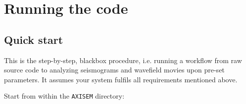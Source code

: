 \documentclass{article}
\begin{document}
\newpage

\section{Running the code}

\subsection{Quick start}

This is the step-by-step, blackbox procedure, i.e. running a workflow from raw source code
to analyzing seismograms and wavefield movies upon pre-set parameters. It assumes your
system fulfils all requirements mentioned above.\\

\begin{center}
\end{center}

\noindent Start from within the {\tt AXISEM} directory:
\end{document}
